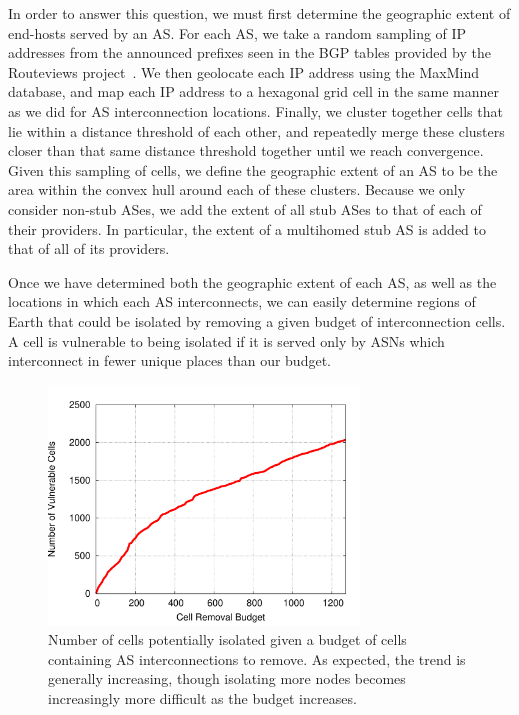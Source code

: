     In order to answer this question, we must first determine the geographic extent of end-hosts served by an AS.
    For each AS, we take a random sampling of IP addresses from the announced prefixes seen in the BGP tables provided by the Routeviews project~\cite{routeviews}. 
    We then geolocate each IP address using the MaxMind database, and map each IP address to a hexagonal grid cell in the same manner as we did for AS interconnection locations.
    Finally, we cluster together cells that lie within a distance threshold of each other, and repeatedly merge these clusters closer than that same distance threshold together until we reach convergence.
    Given this sampling of cells, we define the geographic extent of an AS to be the area within the convex hull around each of these clusters. 
    Because we only consider non-stub ASes, we add the extent of all stub ASes to that of each of their providers.
    In particular, the extent of a multihomed stub AS is added to that of all of its providers.

    Once we have determined both the geographic extent of each AS, as well as the locations in which each AS interconnects, we can easily determine regions of Earth that could be isolated by removing a given budget of interconnection cells.
    A cell is vulnerable to being isolated if it is served only by ASNs which interconnect in fewer unique places than our budget.

    \begin{figure}[tb]
\centering
\includegraphics[width=3.25in]{isolation}
\caption[]{\label{fig:isolation} Number of cells potentially isolated given a budget of cells containing AS interconnections to remove. As expected, the trend is generally increasing, though isolating more nodes becomes increasingly more difficult as the budget increases.} 
\end{figure}

